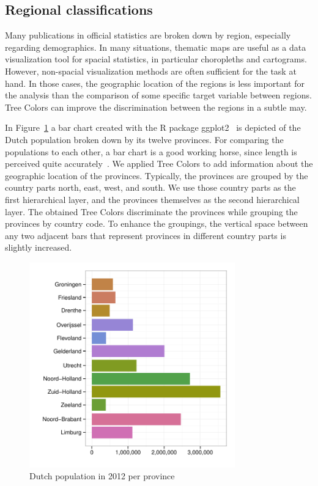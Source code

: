 \documentclass[journal]{vgtc}                %
\begin{document}
\subsection{Regional classifications}
Many publications in official statistics are broken down by region, especially regarding demographics.
In many situations, thematic maps are useful as a data visualization tool for spacial statistics, in particular choropleths and cartograms. However, non-spacial visualization methods are often sufficient for the task at hand. In those cases, the geographic location of the regions is less important for the analysis than the comparison of some specific target variable between regions. Tree Colors can improve the discrimination between the regions in a subtle may.

In Figure~\ref{fig:barApp} a bar chart created with the R package ggplot2~\cite{ggplot2} is depicted of the Dutch population broken down by its twelve provinces. For comparing the populations to each other, a bar chart is a good working horse, since length is perceived quite accurately~\cite{Mackinlay1986}. We applied Tree Colors to add information about the geographic location of the provinces. Typically, the provinces are grouped by the country parts north, east, west, and south. We use those country parts as the first hierarchical layer, and the provinces themselves as the second hierarchical layer. The obtained Tree Colors discriminate the provinces while grouping the provinces by country code. To enhance the groupings, the vertical space between any two adjacent bars that represent provinces in different country parts is slightly increased.

\begin{figure}[tb]
  \centering
  \includegraphics[width=3.5in]{pop_bar.pdf}

  \caption{Dutch population in 2012 per province}\label{fig:barApp}

\end{figure}
\end{document}
